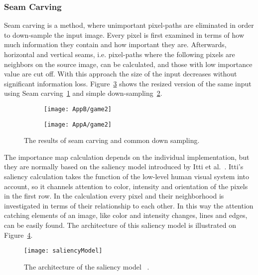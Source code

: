 \documentclass[draft,final]{vutinfth} %
\begin{document}
	\subsubsection{Seam Carving}
	\label{seamCarving}
	Seam carving is a method, where unimportant pixel-paths are eliminated in order to down-sample the input image.
	Every pixel is first examined in terms of how much information they contain and how important they are.
	Afterwards, horizontal and vertical seams, i.e. pixel-paths where the following pixels are neighbors on the source image, can be calculated, and those with low importance value are cut off.
	With this approach the size of the input decreases without significant information loss.  
	Figure~\ref{fig:diff} shows the resized version of the same input using Seam carving~\ref{fig:seamCarv} and simple down-sampling~\ref{fig:downSampl}.\par 
	\begin{figure}[H]
		\centering
		\begin{subfigure}[b]{0.45\columnwidth}
			\centering
			\texttt{[image: AppB/game2]}
			\label{fig:seamCarv}
		\end{subfigure}
		\begin{subfigure}[b]{0.45\columnwidth}
			\centering
			\texttt{[image: AppA/game2]}
			\label{fig:downSampl}
		\end{subfigure}
		\caption{The results of seam carving and common down sampling.}
		\label{fig:diff} %
	\end{figure}
	The importance map calculation depends on the individual implementation, but they are normally based on the saliency model introduced by Itti et al.~\cite{itti1998model}.
	Itti's saliency calculation takes the function of the low-level human visual system into account, so it channels attention to color, intensity and orientation of the pixels in the first row.
	In the calculation every pixel and their neighborhood is investigated in terms of their relationship to each other.
	In this way the attention catching elements of an image, like color and intensity changes, lines and edges, can be easily found. 
	The architecture of this saliency model is illustrated on Figure~\ref{fig:salMod}.\par 
	\begin{figure}[H]
		\centering		
		\texttt{[image: saliencyModel]}
		\caption{The architecture of the saliency model ~\cite{itti1998model}.}
		\label{fig:salMod}
	\end{figure}
\end{document}
